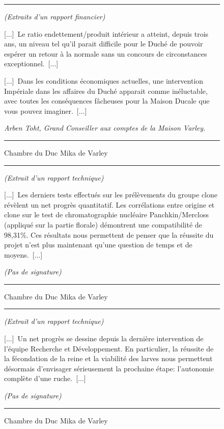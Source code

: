 \documentclass{article}
\newcommand{\newcharacter}{\clearpage\setcounter{figure}{0}}
\newcommand{\indice}[4]{
  \begin{figure}[H]
    \begin{center}
      \rule{0.5\textwidth}{1pt}
    \end{center}
    \begin{framed}
      \begin{samepage}
        \textit{#1}
        \nopagebreak

        #2

        \nopagebreak

        \hfill\textit{#3}
      \end{samepage}
    \end{framed}
    \caption{#4}
    \begin{center}
      \rule{0.5\textwidth}{1pt}
    \end{center}
  \end{figure}
}
\begin{document}
\newcharacter

\indice
{(Extraits d'un rapport financier)}
{
    [...]~Le ratio endettement/produit intérieur a atteint, depuis trois ans,
    un niveau tel qu'il parait difficile pour le Duché de pouvoir espérer un
    retour à la normale sans un concours de circonstances exceptionnel.~[...]

    \nobreak

    [...]~Dans les conditions économiques actuelles, une intervention Impériale
    dans les affaires du Duché apparait comme inéluctable, avec toutes les
    conséquences fâcheuses pour la Maison Ducale que vous pouvez
    imaginer.~[...]
}{Arben Toht, Grand Conseiller aux comptes de la Maison Varley.}
{Chambre du Duc Mika de Varley}

\indice
{(Extrait d'un rapport technique)}
{
    [...]~Les derniers tests effectués sur les prélèvements du groupe
    \og clone\fg{} révèlent un net progrès quantitatif. Les corrélations entre
    \og origine\fg{} et \og clone\fg{} sur le test de chromatographie nucléaire
    Panchkin/Mercloss (appliqué sur la partie florale) démontrent une
    compatibilité de 98,31\%. Ces résultats nous permettent de penser que la
    réussite du projet n'est plus maintenant qu'une question de temps et de
    moyens.~[...]
}{(Pas de signature)}
{Chambre du Duc Mika de Varley}

\indice
{(Extrait d'un rapport technique)}
{
    [...]~Un net progrès se dessine depuis la dernière intervention de l'équipe
    Recherche et Développement. En particulier, la réussite de la fécondation
    de la reine et la viabilité des larves nous permettent désormais
    d'envisager sérieusement la prochaine étape: l'autonomie complète d'une
    ruche.~[...]
}{(Pas de signature)}
{Chambre du Duc Mika de Varley}
\end{document}
